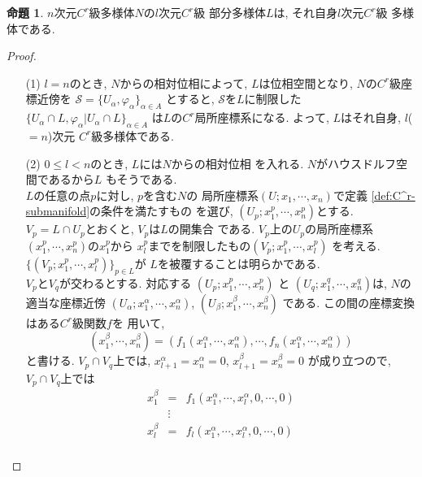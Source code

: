 \documentclass[a4j,12pt]{jarticle}
\theoremstyle{definition}
\newtheorem{proposition}[theorem]{命題}
\begin{document}
\begin{proposition}\label{prop:dim of C^r-submanifold}
    $n$次元$C^r$級多様体$N$の$l$次元$C^r$級
    部分多様体$L$は, それ自身$l$次元$C^r$級
    多様体である. 
\end{proposition}
\begin{proof}
    \begin{itemize}
        \item[(1)]
        $l=n$のとき, $N$からの相対位相によって, 
        $L$は位相空間となり, 
        $N$の$C^r$級座標近傍を
        $\mathcal{S}=
        \{U_\alpha,\varphi _\alpha\}_{\alpha\in A}$
        とすると, $\mathcal{S}$を$L$に制限した
        $\{U_\alpha \cap L,
        \varphi _\alpha |U_\alpha \cap L\}_{\alpha\in A}$
        は$L$の$C^r$局所座標系になる. 
        よって, $L$はそれ自身, $l$($=n$)次元
        $C^r$級多様体である. 
        \item[(2)] 
        $0\leq l<n$のとき, $L$には$N$からの相対位相
        を入れる. $N$がハウスドルフ空間であるから$L$
        もそうである. \\
        $L$の任意の点$p$に対し, $p$を含む$N$の
        局所座標系$(U;x_1,\cdots ,x_n)$で定義
        \ref{def:C^r-submanifold}の条件を満たすもの
        を選び, $(U_p;x^p_1,\cdots ,x^p_n)$とする. 
        $V_p=L\cap U_p$とおくと, $V_p$は$L$の開集合
        である. $V_p$上の$U_p$の局所座標系
        $(x^p_1, \cdots ,x^p_n)$の$x^p_1$から
        $x^p_l$までを制限したもの$(V_p;x^p_1,\cdots ,x^p_l)$
        を考える. \\
        $\{(V_p;x^p_1,\cdots ,x^p_l)\}_{p\in L}$が
        $L$を被覆することは明らかである.\\
        $V_p$と$V_q$が交わるとする. 対応する
        $(U_p;x^p_1,\cdots ,x^p_n)$ と
        $(U_q;x^q_1,\cdots ,x^q_n)$は, 
        $N$の適当な座標近傍
        $(U_\alpha ;x^\alpha_1, \cdots ,x^\alpha_n)$,
        $(U_\beta ;x^\beta_1, \cdots ,x^\beta_n)$
        である. この間の座標変換はある$C^r$級関数$f$を
        用いて, 
        $$(x^\beta_1, \cdots ,x^\beta_n)
        =(f_1(x^\alpha_1, \cdots ,x^\alpha_n), \cdots 
        , f_n(x^\alpha_1, \cdots ,x^\alpha_n))$$
        と書ける. $V_p\cap V_q$上では, 
        $x^\alpha_{l+1}=x^\alpha_n=0$, $x^\beta_{l+1}=x^\beta_n=0$
        が成り立つので, $V_p\cap V_q$上では
        \begin{eqnarray*}
            x^\beta_1&=&f_1(x^\alpha_1, \cdots ,x^\alpha_l,0,\cdots ,0)\\
            &\vdots& \\
            x^\beta_l&=&f_l(x^\alpha_1, \cdots ,x^\alpha_l,0,\cdots ,0)\\

\end{eqnarray*}
\end{itemize}
\end{proof}
\end{document}
